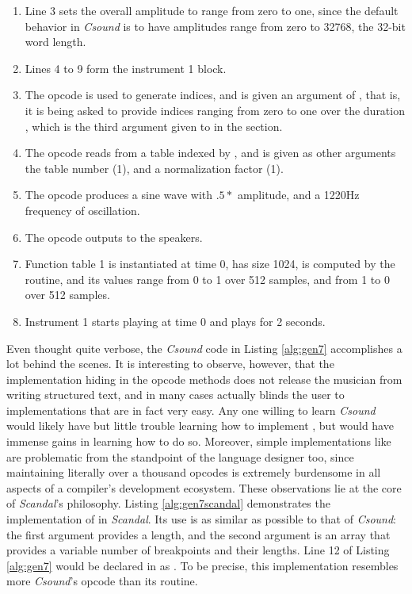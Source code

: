 \begin{enumerate}
	\addtocounter{enumi}{2}
	\item Line 3 sets the overall amplitude to range from zero to one, since the default behavior in \emph{Csound} is to have amplitudes range from zero to 32768, the 32-bit word length.
	\item Lines 4 to 9 form the instrument 1 block.
	\item The  opcode is used to generate indices, and is given an argument of , that is, it is being asked to provide indices ranging from zero to one over the duration , which is the third argument given to  in the  section.
	\item The  opcode reads from a table indexed by , and is given as other arguments the table number (1), and a normalization factor (1).
	\item The  opcode produces a sine wave with $.5 * $  amplitude, and a 1220Hz frequency of oscillation.
	\item The  opcode outputs  to the speakers.
	\addtocounter{enumi}{3}
	\item Function table 1 is instantiated at time 0, has size 1024, is computed by the  routine, and its values range from 0 to 1 over 512 samples, and from 1 to 0 over 512 samples.
	\item Instrument 1 starts playing at time 0 and plays for 2 seconds.
\end{enumerate}

Even thought quite verbose, the \emph{Csound} code in Listing \ref{alg:gen7} accomplishes a lot behind the scenes. It is interesting to observe, however, that the implementation hiding in the opcode methods does not release the musician from writing structured text, and in many cases actually blinds the user to implementations that are in fact very easy. Any one willing to learn \emph{Csound} would likely have but little trouble learning how to implement , but would have immense gains in learning how to do so. Moreover, simple implementations like  are problematic from the standpoint of the language designer too, since maintaining literally over a thousand opcodes is extremely burdensome in all aspects of a compiler's development ecosystem. These observations lie at the core of \emph{Scandal}'s philosophy. Listing \ref{alg:gen7scandal} demonstrates the implementation of  in \emph{Scandal}. Its use is as similar as possible to that of \emph{Csound}: the first argument provides a length, and the second argument is an array that provides a variable number of breakpoints and their lengths. Line 12 of Listing \ref{alg:gen7} would be declared in  as . To be precise, this implementation resembles more \emph{Csound}'s  opcode than its  routine.

